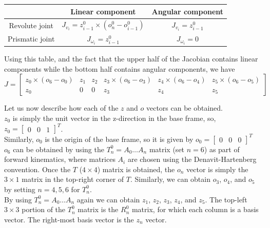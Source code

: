 \documentclass{article}
\begin{document}
\begin{table}[h!]
    \begin{center}
        \begin{tabular}{|c|c|c|}
        \hline
        & Linear component & Angular component\\
        \hline
        Revolute joint & \(J_{v_i} = z^0_{i-1} \times (o^0_n - o^0_{i-1})\) & \(J_{v_i} = z^0_{i-1}\) \\
        Prismatic joint & \(J_{\omega_i} = z^0_{i-1}\) & \(J_{\omega_i} = 0\)\\
        \hline
        \end{tabular}
    \end{center}
\end{table}

Using this table, and the fact that the upper half of the Jacobian contains linear components while the bottom half
contains angular components, we have
\[
    J =
    \begin{bmatrix}
        z_{0} \times (o_6 - o_{0}) & z_1 & z_2 & z_3 \times (o_6 - o_3) & z_4 \times (o_6 - o_4) & z_5 \times (o_6 - o_5) \\
        z_0 & 0 & 0 & z_3 & z_4 & z_5
    \end{bmatrix}
\]

Let us now describe how each of the $z$ and $o$ vectors can be obtained.\\

$z_0$ is simply the unit vector in the z-direction in the base frame, so, $z_0 = \begin{bmatrix}
    0 & 0 & 1
\end{bmatrix}^T$.\\

Similarly, $o_0$ is the origin of the base frame, so it is given by $o_0 = \begin{bmatrix}
    0 & 0 & 0
\end{bmatrix}^T$\\

$o_6$ can be obtained by using the $T^0_n = A_0 \dots A_n$ matrix (set $n = 6$) as part of forward kinematics, where matrices $A_i$ are chosen using the
Denavit-Hartenberg convention. Once the $T$ ($4 \times 4$) matrix is obtained, the $o_n$ vector is simply the $3 \times 1$ matrix in the top-right corner of $T$.
Similarly, we can obtain $o_3$, $o_4$, and $o_5$ by setting $n = 4, 5 ,6$ for $T^0_n$.\\

By using $T^0_n = A_0 \dots A_n$ again we can obtain $z_1$, $z_2$, $z_3$, $z_4$, and $z_5$. The top-left $3 \times 3$ portion of the $T^0_n$ matrix is the
$R^0_n$ matrix, for which each column is a basis vector. The right-most basis vector is the $z_n$ vector.\\
\end{document}
